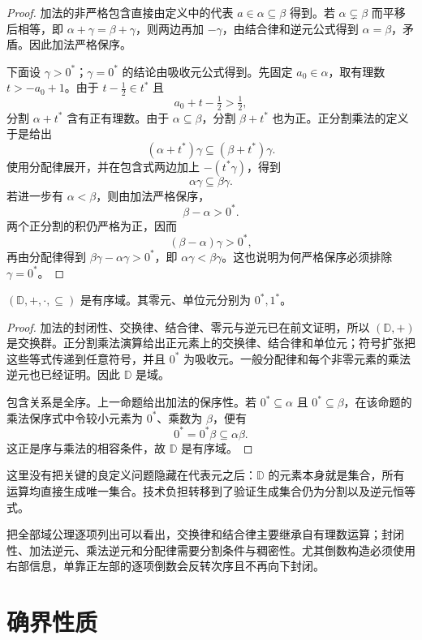 \begin{proof}
加法的非严格包含直接由定义中的代表 \(a\in\alpha\subseteq\beta\) 得到。若 \(\alpha\subsetneq\beta\) 而平移后相等，即
\(\alpha+\gamma=\beta+\gamma\)，则两边再加 \(-\gamma\)，由结合律和逆元公式得到 \(\alpha=\beta\)，矛盾。因此加法严格保序。

下面设 \(\gamma>0^*\)；\(\gamma=0^*\) 的结论由吸收元公式得到。先固定 \(a_0\in\alpha\)，取有理数 \(t>-a_0+1\)。由于
\(t-\tfrac12\in t^*\) 且
\[
  a_0+t-\tfrac12>\tfrac12,
\]
分割 \(\alpha+t^*\) 含有正有理数。由于 \(\alpha\subseteq\beta\)，分割
\(\beta+t^*\) 也为正。正分割乘法的定义于是给出
\[
  (\alpha+t^*)\gamma\subseteq(\beta+t^*)\gamma.
\]
使用分配律展开，并在包含式两边加上 \(-(t^*\gamma)\)，得到
\[
  \alpha\gamma\subseteq\beta\gamma.
\]
若进一步有 \(\alpha<\beta\)，则由加法严格保序，
\[
  \beta-\alpha>0^*.
\]
两个正分割的积仍严格为正，因而
\[
 (\beta-\alpha)\gamma>0^*,
\]
再由分配律得到 \(\beta\gamma-\alpha\gamma>0^*\)，即
\(\alpha\gamma<\beta\gamma\)。这也说明为何严格保序必须排除
\(\gamma=0^*\)。
\end{proof}

\begin{theorem}
\((\mathbb D,+,\cdot,\subseteq)\) 是有序域。其零元、单位元分别为 \(0^*,1^*\)。
\end{theorem}

\begin{proof}
加法的封闭性、交换律、结合律、零元与逆元已在前文证明，所以 \((\mathbb D,+)\) 是交换群。正分割乘法演算给出正元素上的交换律、结合律和单位元；符号扩张把这些等式传递到任意符号，并且 \(0^*\) 为吸收元。一般分配律和每个非零元素的乘法逆元也已经证明。因此 \(\mathbb D\) 是域。

包含关系是全序。上一命题给出加法的保序性。若
\(0^*\subseteq\alpha\) 且 \(0^*\subseteq\beta\)，在该命题的乘法保序式中令较小元素为 \(0^*\)、乘数为 \(\beta\)，便有
\[
 0^*=0^*\beta\subseteq\alpha\beta.
\]
这正是序与乘法的相容条件，故 \(\mathbb D\) 是有序域。
\end{proof}

这里没有把关键的良定义问题隐藏在代表元之后：\(\mathbb D\) 的元素本身就是集合，所有运算均直接生成唯一集合。技术负担转移到了验证生成集合仍为分割以及逆元恒等式。

把全部域公理逐项列出可以看出，交换律和结合律主要继承自有理数运算；封闭性、加法逆元、乘法逆元和分配律需要分割条件与稠密性。尤其倒数构造必须使用右部信息，单靠正左部的逐项倒数会反转次序且不再向下封闭。

\section{确界性质}

